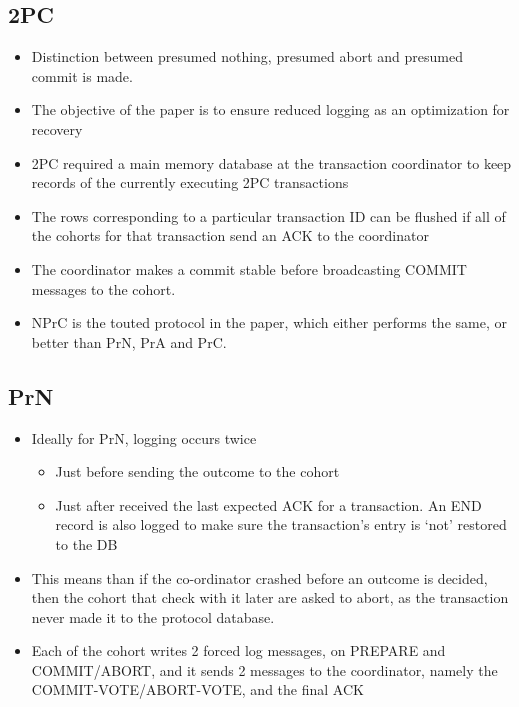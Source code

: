 \documentclass[a4paper]{article}
\begin{document}
\subsection{2PC}

\begin{itemize}
\item
    Distinction between presumed nothing, presumed abort and presumed
    commit is made.
\item
    The objective of the paper is to ensure reduced logging as an
    optimization for recovery
\item
    2PC required a main memory database at the transaction coordinator to
    keep records of the currently executing 2PC transactions
\item
    The rows corresponding to a particular transaction ID can be flushed
    if all of the cohorts for that transaction send an ACK to the
    coordinator
\item
    The coordinator makes a commit stable before broadcasting COMMIT
    messages to the cohort.
\item
    NPrC is the touted protocol in the paper, which either performs the
    same, or better than PrN, PrA and PrC.
\end{itemize}

\subsection{PrN}

\begin{itemize}
\item
    Ideally for PrN, logging occurs twice

    \begin{itemize}
        \item
        Just before sending the outcome to the cohort
    \item
        Just after received the last expected ACK for a transaction. An END
        record is also logged to make sure the transaction's entry is `not'
        restored to the DB
    \end{itemize}
\item
    This means than if the co-ordinator crashed before an outcome is
    decided, then the cohort that check with it later are asked to abort,
    as the transaction never made it to the protocol database.
\item
    Each of the cohort writes 2 forced log messages, on PREPARE and
    COMMIT/ABORT, and it sends 2 messages to the coordinator, namely the
    COMMIT-VOTE/ABORT-VOTE, and the final ACK
\end{itemize}
\end{document}
